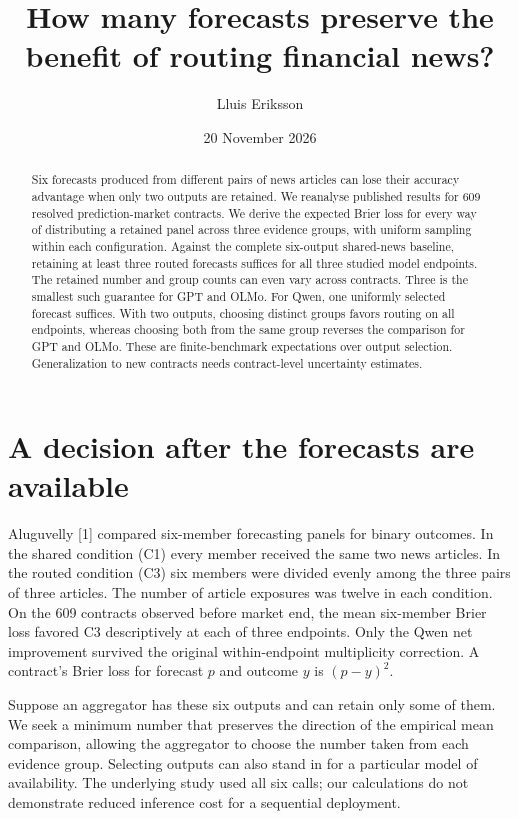 \documentclass[11pt]{article}
\title{How many forecasts preserve the benefit of routing financial news?}
\author{Lluis Eriksson}
\date{20 November 2026}
\begin{document}
\maketitle
\begin{abstract}
Six forecasts produced from different pairs of news articles can lose their accuracy advantage when only two outputs are retained. We reanalyse published results for 609 resolved prediction-market contracts. We derive the expected Brier loss for every way of distributing a retained panel across three evidence groups, with uniform sampling within each configuration. Against the complete six-output shared-news baseline, retaining at least three routed forecasts suffices for all three studied model endpoints. The retained number and group counts can even vary across contracts. Three is the smallest such guarantee for GPT and OLMo. For Qwen, one uniformly selected forecast suffices. With two outputs, choosing distinct groups favors routing on all endpoints, whereas choosing both from the same group reverses the comparison for GPT and OLMo. These are finite-benchmark expectations over output selection. Generalization to new contracts needs contract-level uncertainty estimates.
\end{abstract}

\section{A decision after the forecasts are available}
Aluguvelly [1] compared six-member forecasting panels for binary outcomes. In the shared condition (C1) every member received the same two news articles. In the routed condition (C3) six members were divided evenly among the three pairs of three articles. The number of article exposures was twelve in each condition. On the 609 contracts observed before market end, the mean six-member Brier loss favored C3 descriptively at each of three endpoints. Only the Qwen net improvement survived the original within-endpoint multiplicity correction. A contract's Brier loss for forecast $p$ and outcome $y$ is $(p-y)^2$.

Suppose an aggregator has these six outputs and can retain only some of them. We seek a minimum number that preserves the direction of the empirical mean comparison, allowing the aggregator to choose the number taken from each evidence group. Selecting outputs can also stand in for a particular model of availability. The underlying study used all six calls; our calculations do not demonstrate reduced inference cost for a sequential deployment.
\newpage
\end{document}
